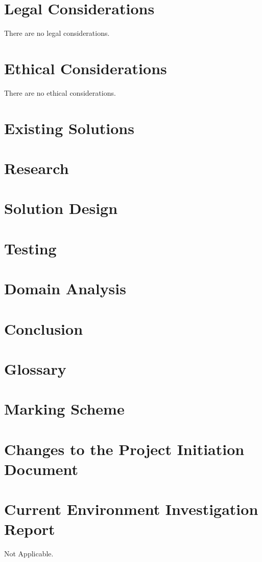 \documentclass[a4paper,12pt]{report}
\begin{document}
\chapter{Legal Considerations}
There are no legal considerations.
\chapter{Ethical Considerations}
There are no ethical considerations.
\chapter{Existing Solutions}

\chapter{Research}

\chapter{Solution Design}

\chapter{Testing}

\chapter{Domain Analysis}

\chapter{Conclusion}


\printbibliography[heading=bibintoc]

\appendix
\chapter{Glossary}
\printglossaries
\chapter{Marking Scheme}
\chapter{Changes to the Project Initiation Document}
\chapter{Current Environment Investigation Report}
Not Applicable.
\end{document}
